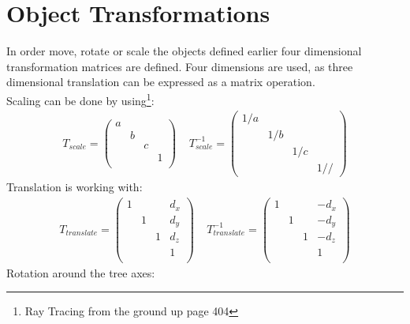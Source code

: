 \section{Object Transformations}
In order move, rotate or scale the objects defined earlier four dimensional transformation matrices are defined. Four dimensions are used, as three dimensional translation can be expressed as a matrix operation. \\ 
Scaling can be done by using\footnote{Ray Tracing from the ground up page 404}:
\begin{align}
T_{scale} = \begin{pmatrix}
a &   &   &\\
  & b &   &\\
  &   & c &\\
  &   &   & 1 \\
\end{pmatrix}
\;\;\;\; T_{scale}^{-1} = 
\begin{pmatrix}
1/a &   & & \\
  & 1/b & & \\
  &   & 1/c & \\
  &   &     & 1 //
\end{pmatrix}
\end{align}
Translation is working with:
\begin{align}
T_{translate} = \begin{pmatrix}
1 &   &  & d_x\\
  & 1 &  & d_y\\
  &   & 1 & d_z \\
  &   &   & 1 \\
\end{pmatrix}
\;\;\;\; T_{translate}^{-1} = 
\begin{pmatrix}
1 &   &  & -d_x\\
  & 1 &  & -d_y\\
  &   & 1 & -d_z \\
  &   &   & 1 \\\end{pmatrix}
\end{align}
Rotation around the tree axes:

